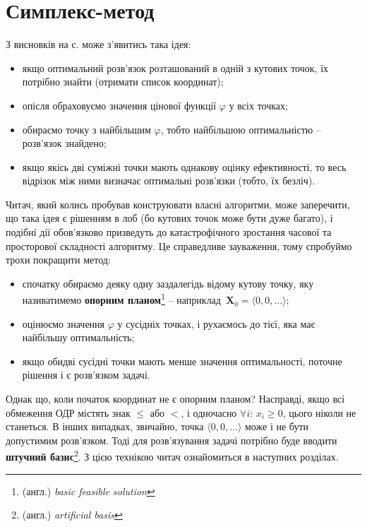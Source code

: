 \documentclass[\main/book.tex]{subfiles}
\begin{document}
\section{Симплекс-метод}
\label{section:linear:simplex}

З висновків на с. \pageref{conclusion:linear:optimal_solution} може з'явитись така ідея:

\begin{itemize}
 \item якщо оптимальний розв'язок розташований в одній з кутових точок, їх потрібно знайти (отримати список координат);
 \item опісля обраховуємо значення цінової функції $\varphi$ у всіх точках;
 \item обираємо точку з найбільшим $\varphi$, тобто найбільшою оптимальністю -- розв'язок знайдено;
 \item якщо якісь дві суміжні точки мають однакову оцінку ефективності, то весь відрізок між ними визначає оптимальні розв'язки (тобто, їх безліч).
\end{itemize}

Читач, який колись пробував конструювати власні алгоритми, може заперечити, що така ідея є рішенням \flqq{}в лоб\frqq{} (бо кутових точок може бути дуже багато), і подібні дії обов'язково призведуть до катастрофічного зростання часової та просторової складності алгоритму. Це справедливе зауваження, тому спробуймо трохи покращити метод:

\begin{itemize}
 \item спочатку обираємо деяку одну заздалегідь відому кутову точку, яку називатимемо \textbf{опорним планом}\footnote{(англ.) \textit{basic feasible solution}} -- наприклад~$\mathbf{X}_0 = {\langle 0, 0, \ldots \rangle}$;
 \item оцінюємо значення $\varphi$ у сусідніх точках, і рухаємось до тієї, яка має найбільшу оптимальність;
 \item якщо обидві сусідні точки мають менше значення оптимальності, поточне рішення і є розв'язком задачі.
\end{itemize}

Однак що, коли початок координат не є опорним планом? Насправді, якщо всі обмеження ОДР містять знак \flqq{}$\leq$\frqq{} або \flqq{}$<$\frqq{}, і одночасно ${\forall i:}\, {x_i \geq 0}$, цього ніколи не станеться. В інших випадках, звичайно, точка ${\langle 0, 0, \ldots \rangle}$ може і не бути допустимим розв'язком. Тоді для розв'язування задачі потрібно буде вводити \textbf{штучний базис}\footnote{(англ.) \textit{artificial basis}}. З цією технікою читач ознайомиться в наступних розділах.
\end{document}
